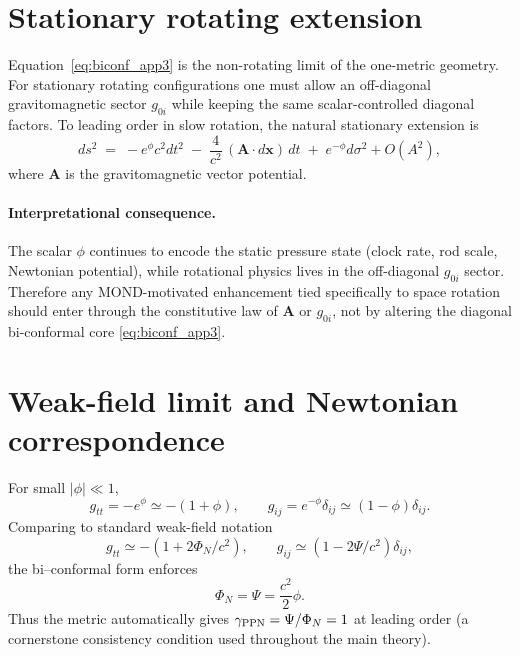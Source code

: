\documentclass[11pt]{article}
\begin{document}
\section{Stationary rotating extension}\label{sec:stationary}
Equation~\eqref{eq:biconf_app3} is the non-rotating limit of the one-metric geometry. For stationary rotating configurations one must allow an off-diagonal gravitomagnetic sector $g_{0i}$ while keeping the same scalar-controlled diagonal factors. To leading order in slow rotation, the natural stationary extension is
\begin{equation}
ds^2 \;=\; -e^{\phi}c^2dt^2 \;-\; \frac{4}{c^2}\,(\bm{A}\!\cdot\! d\bm{x})\,dt \;+\; e^{-\phi}d\sigma^2 + O(A^2),
\label{eq:biconf_stationary}
\end{equation}
where $\bm{A}$ is the gravitomagnetic vector potential.

\paragraph{Interpretational consequence.}
The scalar $\phi$ continues to encode the static pressure state (clock rate, rod scale, Newtonian potential), while rotational physics lives in the off-diagonal $g_{0i}$ sector. Therefore any MOND-motivated enhancement tied specifically to space rotation should enter through the constitutive law of $\bm{A}$ or $g_{0i}$, not by altering the diagonal bi-conformal core \eqref{eq:biconf_app3}.

\section{Weak-field limit and Newtonian correspondence}\label{sec:weak}
For small $|\phi|\ll 1$,
\begin{equation}
g_{tt}=-e^{\phi}\simeq -(1+\phi),\qquad
g_{ij}=e^{-\phi}\delta_{ij}\simeq (1-\phi)\delta_{ij}.
\end{equation}
Comparing to standard weak-field notation
\begin{equation}
g_{tt}\simeq -(1+2\Phi_N/c^2),\qquad g_{ij}\simeq (1-2\Psi/c^2)\delta_{ij},
\end{equation}
the bi--conformal form enforces
\begin{equation}
\Phi_N=\Psi=\frac{c^2}{2}\phi.
\label{eq:PhiPsi}
\end{equation}
Thus the metric automatically gives $\gamma_{\rm PPN}=\Psi/\Phi_N=1$ at leading order (a cornerstone consistency condition used throughout the main theory).
\end{document}
